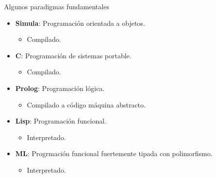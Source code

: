 \begin{frame}[t]{Algunos paradigmas fundamentales}
  \begin{itemize}
    \item \textbf{\color{blue}Simula}: Programación orientada a objetos.
      \begin{itemize}
        \item Compilado.
      \end{itemize}
    \item \textbf{\color{blue}C}: Programación de sistemas portable.
      \begin{itemize}
        \item Compilado.
      \end{itemize}
    \item \textbf{\color{blue}Prolog}: Programación lógica.
      \begin{itemize}
        \item Compilado a código máquina abstracto.
      \end{itemize}
    \item \textbf{\color{blue}Lisp}: Programación funcional.
      \begin{itemize}
        \item Interpretado.
      \end{itemize}
    \item \textbf{\color{blue}ML}: Progrmación funcional fuertemente tipada con polimorfismo.
      \begin{itemize}
        \item Interpretado.
      \end{itemize}
  \end{itemize}
\end{frame}


